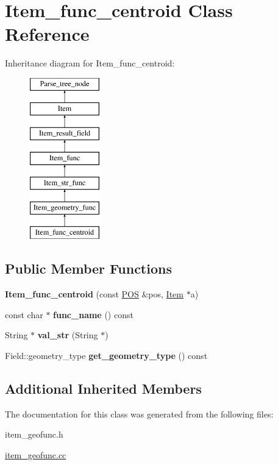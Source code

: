 \hypertarget{classItem__func__centroid}{}\section{Item\+\_\+func\+\_\+centroid Class Reference}
\label{classItem__func__centroid}
Inheritance diagram for Item\+\_\+func\+\_\+centroid\+:\begin{figure}[H]
\begin{center}
\leavevmode
\includegraphics[height=7.000000cm]{classItem__func__centroid}
\end{center}
\end{figure}
\subsection*{Public Member Functions}
\begin{DoxyCompactItemize}
\item 
\mbox{\label{classItem__func__centroid_a87a93dc6e5c9bb0e999439ad02836ac6}} 
{\bfseries Item\+\_\+func\+\_\+centroid} (const \mbox{\hyperlink{structYYLTYPE}{P\+OS}} \&pos, \mbox{\hyperlink{classItem}{Item}} $\ast$a)
\item 
\mbox{\label{classItem__func__centroid_ab70e7adfb109952a0a010575d9211178}} 
const char $\ast$ {\bfseries func\+\_\+name} () const
\item 
\mbox{\label{classItem__func__centroid_aaa9810493f711b3fb98f3d4dad58c95c}} 
String $\ast$ {\bfseries val\+\_\+str} (String $\ast$)
\item 
\mbox{\label{classItem__func__centroid_a963f58e4cbd38d8287e908f9148716aa}} 
Field\+::geometry\+\_\+type {\bfseries get\+\_\+geometry\+\_\+type} () const
\end{DoxyCompactItemize}
\subsection*{Additional Inherited Members}


The documentation for this class was generated from the following files\+:\begin{DoxyCompactItemize}
\item 
item\+\_\+geofunc.\+h\item 
\mbox{\hyperlink{item__geofunc_8cc}{item\+\_\+geofunc.\+cc}}\end{DoxyCompactItemize}

